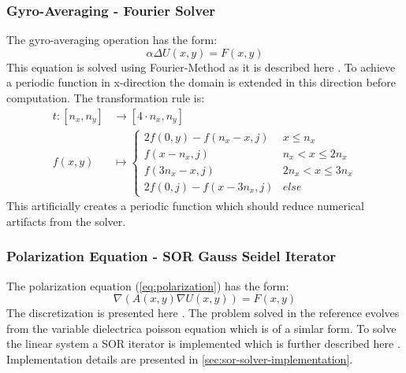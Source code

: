 \subsubsection{Gyro-Averaging - Fourier Solver}
The gyro-averaging operation has the form:
\begin{equation}
    \alpha \Delta U(x, y) = F(x, y)
\end{equation}
This equation is solved using Fourier-Method as it is described here \cite{fft-poisson}. To achieve a periodic function in x-direction the domain is extended in this direction before computation. The transformation rule is:
\begin{equation}
\label{eq:gyro-transformation}
\begin{split}
    t\colon [n_x, n_y] & \to [4 \cdot n_x, n_y]\\
    f(x, y) &\mapsto \begin{cases}
    2 f(0, y) - f(n_x - x, j) & x \leq n_x\\
    f(x - n_x, j) & n_x < x \leq 2n_x\\
    f(3n_x-x,j) & 2n_x < x \leq 3n_x \\
    2 f(0, j) - f(x - 3n_x, j) & else
    \end{cases}
\end{split}
\end{equation}
This artificially creates a periodic function which should reduce numerical artifacts from the solver.

\subsubsection{Polarization Equation - \ac{SOR} Gauss Seidel Iterator} \label{sec:polarization-equation}
The polarization equation (\autoref{eq:polarization}) has the form:
\begin{equation}
    \nabla\left( A(x, y) \nabla U(x, y)\right) = F(x, y)
\end{equation}
The discretization is presented here \cite{DielectricPoisson}. The problem solved in the reference evolves from the variable dielectrica poisson equation which is of a simlar form. To solve the linear system a \ac{SOR} iterator is implemented which is further described here \cite{SORPaper}. Implementation details are presented in \autoref{sec:sor-solver-implementation}.
